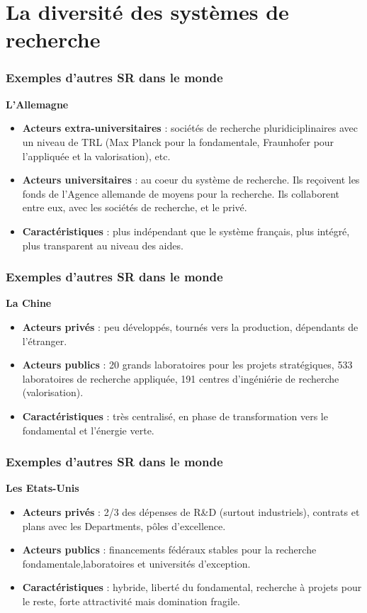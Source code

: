 \documentclass[xcolor=dvipsnames]{beamer}
\begin{document}
	\section{La diversité des systèmes de recherche}
	\begin{frame}
		\frametitle{Exemples d'autres SR dans le monde}
		\textbf{L'Allemagne}
		\begin{itemize}
			\item \textbf{Acteurs extra-universitaires} : sociétés de recherche pluridiciplinaires avec un niveau de TRL (Max Planck pour la fondamentale, Fraunhofer pour l'appliquée et la valorisation), etc.
			\item \textbf{Acteurs universitaires} : au coeur du système de recherche. Ils reçoivent les fonds de l'Agence allemande de moyens pour la recherche. Ils collaborent entre eux, avec les sociétés de recherche, et le privé.
			\item \textbf{Caractéristiques} : plus indépendant que le système français, plus intégré, plus transparent au niveau des aides.
		\end{itemize}
	\end{frame}
	\begin{frame}
		\frametitle{Exemples d'autres SR dans le monde}
		\textbf{La Chine}
		\begin{itemize}
			\item \textbf{Acteurs privés} : peu développés, tournés vers la production, dépendants de l'étranger.
			\item \textbf{Acteurs publics} : 20 grands laboratoires pour les projets stratégiques, 533 laboratoires de recherche appliquée, 191 centres d'ingéniérie de recherche (valorisation).
			\item \textbf{Caractéristiques} : très centralisé, en phase de transformation vers le fondamental et l'énergie verte.
		\end{itemize}
	\end{frame}
	\begin{frame}
		\frametitle{Exemples d'autres SR dans le monde}
		\textbf{Les Etats-Unis}
		\begin{itemize}
			\item \textbf{Acteurs privés} : 2/3 des dépenses de R\&D (surtout industriels), contrats et plans avec les Departments, pôles d'excellence.
			\item \textbf{Acteurs publics} : financements fédéraux stables pour la recherche fondamentale,laboratoires et universités d'exception.
			\item \textbf{Caractéristiques} : hybride, liberté du fondamental, recherche à projets pour le reste, forte attractivité mais domination fragile.
		\end{itemize}
	\end{frame}
\end{document}
